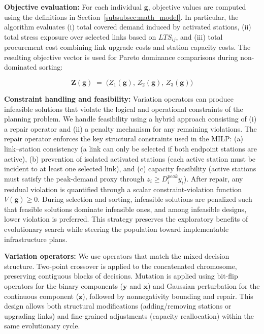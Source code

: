 \documentclass[preprint,authoryear,10pt]{elsarticle}
\begin{document}
\textbf{Objective evaluation:} For each individual $\mathbf{g}$, objective values are computed using the definitions in Section~\ref{subsubsec:math_model}. In particular, the algorithm evaluates (i) total covered demand induced by activated stations, (ii) total stress exposure over selected links based on $LTS_{ij}$, and (iii) total procurement cost combining link upgrade costs and station capacity costs. The resulting objective vector is used for Pareto dominance comparisons during non-dominated sorting:

\begin{equation}
\mathbf{Z}(\mathbf{g}) \;=\; \big(Z_1(\mathbf{g}),\, Z_2(\mathbf{g}),\, Z_3(\mathbf{g})\big)
\end{equation}



\textbf{Constraint handling and feasibility:} Variation operators can produce infeasible solutions that violate the logical and operational constraints of the planning problem. We handle feasibility using a hybrid approach consisting of (i) a repair operator and (ii) a penalty mechanism for any remaining violations. The repair operator enforces the key structural constraints used in the MILP: (a) link--station consistency (a link can only be selected if both endpoint stations are active), (b) prevention of isolated activated stations (each active station must be incident to at least one selected link), and (c) capacity feasibility (active stations must satisfy the peak-demand proxy through $z_i \ge D_i^{peak}y_i$). After repair, any residual violation is quantified through a scalar constraint-violation function $V(\mathbf{g})\ge 0$. During selection and sorting, infeasible solutions are penalized such that feasible solutions dominate infeasible ones, and among infeasible designs, lower violation is preferred. This strategy preserves the exploratory benefits of evolutionary search while steering the population toward implementable infrastructure plans.

\textbf{Variation operators:} We use operators that match the mixed decision structure. Two-point crossover is applied to the concatenated chromosome, preserving contiguous blocks of decisions. Mutation is applied using bit-flip operators for the binary components ($\mathbf{y}$ and $\mathbf{x}$) and Gaussian perturbation for the continuous component ($\mathbf{z}$), followed by nonnegativity bounding and repair. This design allows both structural modifications (adding/removing stations or upgrading links) and fine-grained adjustments (capacity reallocation) within the same evolutionary cycle.
\end{document}
